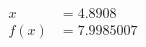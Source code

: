 \documentclass[preview]{standalone}
\begin{document}
\begin{align*}
x &= 4.8908\\f(x) &= 7.9985007
\end{align*}
\end{document}
